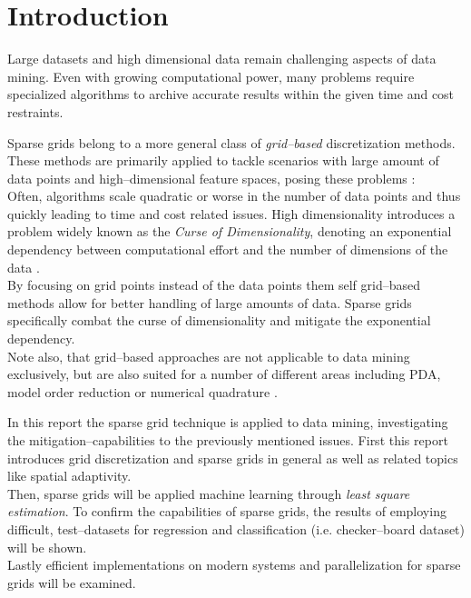 \section{Introduction}
Large datasets and high dimensional data remain challenging aspects of data
mining. Even with growing computational power, many problems require
specialized algorithms to archive accurate results within the given time and
cost restraints.

\par

Sparse grids belong to a more general class of \emph{grid--based}
discretization methods. These methods are primarily applied to
tackle scenarios with large amount of data points and high--dimensional
feature spaces, posing these problems \cite{artbunshort}:
\\
Often, algorithms scale quadratic or worse in the number of data points and
thus quickly leading to time and cost related issues.
High dimensionality introduces a problem widely known as the \emph{Curse of
Dimensionality}, denoting an exponential dependency between computational
effort and the number of dimensions of the data \cite{artbunshort, disspfl}. \\
By focusing on grid points instead
of the data points them self grid--based methods allow for better handling of large amounts of data. 
Sparse grids specifically combat the curse of dimensionality and mitigate
the exponential dependency. \\
Note also, that grid--based approaches are not applicable to data mining
exclusively, but are also
suited for a number of different areas including PDA, model order
reduction \cite{disspeh} or numerical quadrature \cite{artbunlong}.

\par

In this report the sparse grid technique is applied to data mining,
investigating the mitigation--capabilities to the previously mentioned issues.
First this report introduces grid discretization and sparse grids in
general as well as related topics like spatial adaptivity. \\
Then, sparse grids will be applied machine learning
through \emph{least square estimation}. To confirm the capabilities
of sparse grids, the results of employing difficult,
test--datasets for regression and classification (i.e.
checker--board dataset) will be shown. \\
Lastly  efficient implementations on modern systems and parallelization for
sparse grids will be examined.

